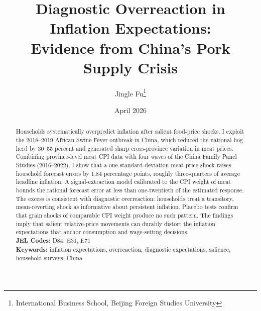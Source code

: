 \documentclass[12pt]{article}
\title{Diagnostic Overreaction in Inflation Expectations: \\
Evidence from China's Pork Supply Crisis}
\author{Jingle Fu\thanks{International Business School, Beijing Foreign Studies University}}
\date{April 2026}
\begin{document}
\maketitle
\thispagestyle{empty}

\begin{abstract}
	\noindent
	Households systematically overpredict inflation after salient food-price shocks. I exploit the 2018--2019 African Swine
	Fever outbreak in China, which reduced the national hog herd by 30--55 percent and generated sharp cross-province
	variation in meat prices. Combining province-level meat CPI data with four waves of the China Family Panel Studies
	(2016--2022), I show that a one-standard-deviation meat-price shock raises household forecast errors by 1.84 percentage
	points, roughly three-quarters of average headline inflation. A signal-extraction model calibrated to the CPI weight of
	meat bounds the rational forecast error at less than one-twentieth of the estimated response. The excess is consistent
	with diagnostic overreaction: households treat a transitory, mean-reverting shock as informative about persistent
	inflation. Placebo tests confirm that grain shocks of comparable CPI weight produce no such pattern. The findings imply
	that salient relative-price movements can durably distort the inflation expectations that anchor consumption and
	wage-setting decisions.
	\\[0.5em]
	\textbf{JEL Codes:} D84, E31, E71 \\
	\textbf{Keywords:} inflation expectations, overreaction,
	diagnostic expectations, salience, household surveys, China
\end{abstract}

\newpage
\setcounter{page}{1}












\newpage
\appendix
{}
\renewcommand{\thetable}{\thesection.\arabic{table}}
\renewcommand{\thefigure}{\thesection.\arabic{figure}}







\newpage
\printbibliography[title={References}]
\end{document}
